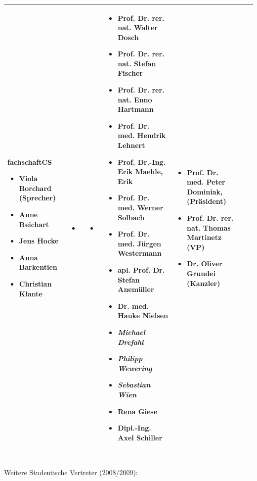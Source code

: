 \documentclass[landscape,a0b,final]{a0poster}
\begin{document}
\begin{tabular}{|p{15cm}||p{15cm}||p{15cm}||p{15cm}||p{15cm}|||p{15cm}||p{15cm}|}
\textbf{fachschaftCS}
\begin{itemize}
\item Viola Borchard (Sprecher)
\item Anne Reichart
\item Jens Hocke
\item Anna Barkentien
\item Christian Klante
\end{itemize}
&
\begin{itemize}
\item
\end{itemize}
&
\begin{itemize}
\item 
\end{itemize}
&
\begin{itemize}
\item Prof. Dr. rer. nat. Walter Dosch
\item Prof. Dr. rer. nat. Stefan Fischer
\item Prof. Dr. rer. nat. Enno Hartmann
\item Prof. Dr. med. Hendrik Lehnert
\item Prof. Dr.-Ing. Erik Maehle, Erik
\item Prof. Dr. med. Werner Solbach
\item Prof. Dr. med. Jürgen Westermann 
\item apl. Prof. Dr. Stefan Anemüller
\item Dr. med. Hauke Nielsen 
\item \textit{Michael Drefahl}
\item \textit{Philipp Wewering}
\item \textit{Sebastian Wien} 
\item	Rena Giese
\item Dipl.-Ing. Axel Schiller
\end{itemize}
&
\begin{itemize}
\item Prof. Dr. med. Peter Dominiak, (Präsident)
\item Prof. Dr. rer. nat. Thomas Martinetz (VP) 
\item Dr. Oliver Grundei (Kanzler)
\end{itemize}\\
\hline
\hline
\end{tabular} \\
Weitere Studentische Vertreter (2008/2009): 
\end{document}
